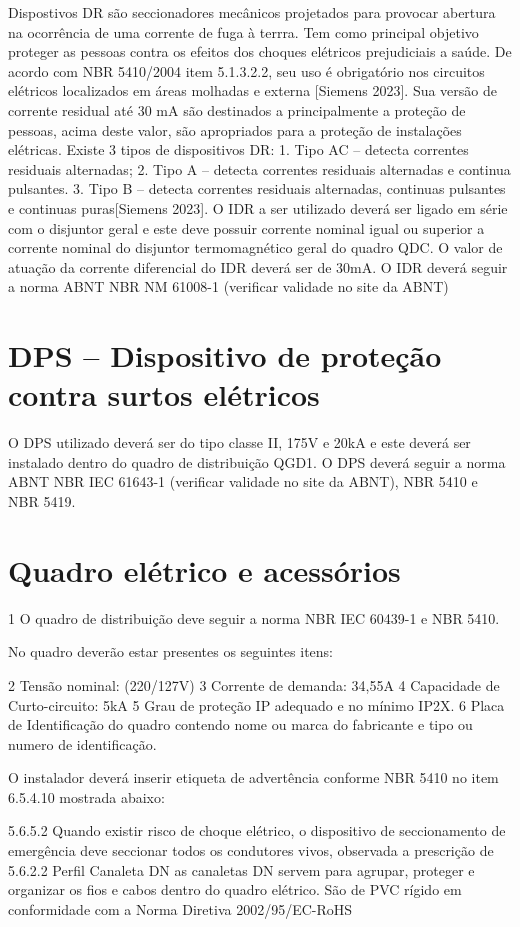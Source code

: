 Dispostivos DR são seccionadores mecânicos projetados para provocar abertura na ocorrência de uma corrente de fuga à terrra. Tem como principal objetivo proteger as pessoas contra os efeitos dos choques elétricos prejudiciais a saúde. De acordo com NBR 5410/2004 item 5.1.3.2.2, seu uso é obrigatório nos circuitos elétricos localizados em áreas molhadas e externa [Siemens 2023].
Sua versão de corrente residual até 30 mA são destinados a principalmente a proteção de pessoas, acima deste valor, são apropriados para a proteção de instalações elétricas. Existe 3 tipos de dispositivos DR:
    1. Tipo AC – detecta correntes residuais alternadas;
    2. Tipo A – detecta correntes residuais alternadas e continua pulsantes.
    3. Tipo B – detecta correntes residuais alternadas, continuas pulsantes e continuas puras[Siemens 2023].
O IDR a ser utilizado deverá ser ligado em série com o disjuntor geral e este deve possuir corrente nominal igual ou superior a corrente nominal do disjuntor termomagnético geral do quadro QDC. O valor de atuação da corrente diferencial do IDR deverá ser de 30mA. O IDR deverá seguir a norma ABNT NBR NM 61008-1 (verificar validade no site da ABNT)
\section{DPS – Dispositivo de proteção contra surtos elétricos}
O DPS utilizado deverá ser do tipo classe II, 175V e 20kA e este deverá ser instalado dentro do quadro de distribuição QGD1. O DPS deverá seguir a norma ABNT NBR IEC 61643-1 (verificar validade no site da ABNT), NBR 5410 e NBR 5419.

\section{Quadro elétrico e acessórios}
    1 O quadro de distribuição deve seguir a norma NBR IEC 60439-1 e NBR 5410.

No quadro deverão estar presentes os seguintes itens:

    2 Tensão nominal: (220/127V)
    3 Corrente de demanda: 34,55A
    4 Capacidade de Curto-circuito: 5kA
    5 Grau de proteção IP adequado e no mínimo IP2X.
    6 Placa de Identificação do quadro contendo nome ou marca do fabricante e tipo ou numero de identificação.

O instalador deverá inserir etiqueta de advertência conforme NBR 5410 no item 6.5.4.10 mostrada abaixo:

5.6.5.2 Quando existir risco de choque elétrico, o dispositivo de seccionamento de emergência deve seccionar todos os condutores vivos, observada a prescrição de 5.6.2.2
Perfil
Canaleta DN
as canaletas DN servem para agrupar, proteger e organizar os fios e cabos dentro do quadro elétrico. São de PVC rígido em conformidade com a Norma Diretiva 2002/95/EC-RoHS

